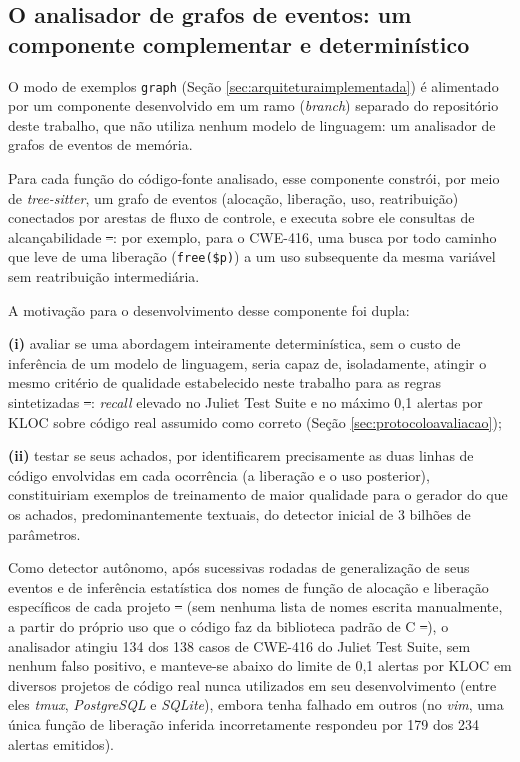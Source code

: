\documentclass[
    12pt,                %
    openright,           %
    oneside,             %
    a4paper,             %
    english,             %
    brazil               %
]{abntex2}
\newcommand{\antigo}[1]{\sout{#1}}
\newcommand{\novo}[1]{{\color{red}#1}}
\begin{document}
\subsection{O analisador de grafos de eventos: um componente complementar e determinístico}
\label{sec:analisadorgrafos}
\par
O modo de exemplos \texttt{graph} (Seção \ref{sec:arquiteturaimplementada}) é alimentado por um componente desenvolvido em um ramo (\textit{branch}) separado do repositório deste trabalho, que não utiliza nenhum modelo de linguagem: um analisador de grafos de eventos de memória.
\par
Para cada função do código-fonte analisado, esse componente constrói, por meio de \textit{tree-sitter}, um grafo de eventos (alocação, liberação, uso, reatribuição) conectados por arestas de fluxo de controle, e executa sobre ele consultas de alcançabilidade\antigo{ --}\novo{:} por exemplo, para o CWE-416, uma busca por todo caminho que leve de uma liberação (\texttt{free(\$p)}) a um uso subsequente da mesma variável sem reatribuição intermediária.
\par
A motivação para o desenvolvimento desse componente foi dupla: 
\par
\textbf{(i)} avaliar se uma abordagem inteiramente determinística, sem o custo de inferência de um modelo de linguagem, seria capaz de, isoladamente, atingir o mesmo critério de qualidade estabelecido neste trabalho para as regras sintetizadas\antigo{ --}\novo{:} \textit{recall} elevado no Juliet Test Suite e no máximo 0,1 alertas por KLOC sobre código real assumido como correto (Seção \ref{sec:protocoloavaliacao}); 
\par
\textbf{(ii)} testar se seus achados, por identificarem precisamente as duas linhas de código envolvidas em cada ocorrência (a liberação e o uso posterior), constituiriam exemplos de treinamento de maior qualidade para o gerador do que os achados, predominantemente textuais, do detector inicial de 3 bilhões de parâmetros.
\par
Como detector autônomo, após sucessivas rodadas de generalização de seus eventos e de inferência estatística dos nomes de função de alocação e liberação específicos de cada projeto\antigo{ --}\novo{ (}sem nenhuma lista de nomes escrita manualmente, a partir do próprio uso que o código faz da biblioteca padrão de C\antigo{ --}\novo{)}, o analisador atingiu 134 dos 138 casos de CWE-416 do Juliet Test Suite, sem nenhum falso positivo, e manteve-se abaixo do limite de 0,1 alertas por KLOC em diversos projetos de código real nunca utilizados em seu desenvolvimento (entre eles \textit{tmux}, \textit{PostgreSQL} e \textit{SQLite}), embora tenha falhado em outros (no \textit{vim}, uma única função de liberação inferida incorretamente respondeu por 179 dos 234 alertas emitidos).
\end{document}
